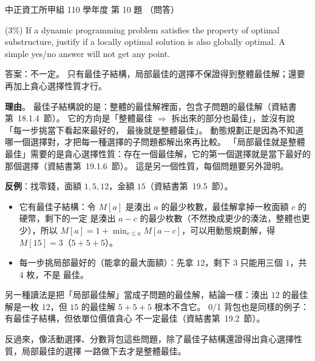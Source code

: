 \begin{pastexam}[label={px:ccu-110-swa-08}]{中正資工所甲組 110 學年度 第 10 題}
（問答）

(3\%) If a dynamic programming problem satisfies the property of optimal substructure, justify if
a locally optimal solution is also globally optimal. A simple yes/no answer will not get any
point.
\end{pastexam}

\begin{pastsoln}
答案：不一定。 只有最佳子結構，局部最佳的選擇不保證得到整體最佳解；還要再加上貪心選擇性質才行。

\textbf{理由}。 最佳子結構說的是：整體的最佳解裡面，包含子問題的最佳解（資結書第~18.1.4~節）。
它的方向是「整體最佳 $\Rightarrow$ 拆出來的部分也最佳」，並沒有說「每一步挑當下看起來最好的，
最後就是整體最佳」。 動態規劃正是因為不知道哪一個選擇對，才把每一種選擇的子問題都解出來再比較。
「局部最佳就是整體最佳」需要的是貪心選擇性質：存在一個最佳解，它的第一個選擇就是當下最好的
那個選擇（資結書第~19.1.6~節）。 這是另一個性質，每個問題要另外證明。

\textbf{反例}：找零錢，面額 $1, 5, 12$，金額 $15$（資結書第~19.5~節）。
\begin{itemize}
\item 它有最佳子結構：令 $M[a]$ 是湊出 $a$ 的最少枚數，最佳解拿掉一枚面額 $c$ 的硬幣，剩下的一定
是湊出 $a - c$ 的最少枚數（不然換成更少的湊法，整體也更少），所以
$M[a] = 1 + \min_{c \le a} M[a - c]$，可以用動態規劃解，得 $M[15] = 3$（$5 + 5 + 5$）。
\item 每一步挑局部最好的（能拿的最大面額）：先拿 $12$，剩下 $3$ 只能用三個 $1$，共 $4$ 枚，不是
最佳。
\end{itemize}
另一種讀法是把「局部最佳解」當成子問題的最佳解，結論一樣：湊出 $12$ 的最佳解是一枚 $12$，但
$15$ 的最佳解 $5 + 5 + 5$ 根本不含它。 0/1 背包也是同樣的例子：有最佳子結構，但依單位價值貪心
不一定最佳（資結書第~19.2~節）。

反過來，像活動選擇、分數背包這些問題，除了最佳子結構還證得出貪心選擇性質，局部最佳的選擇
一路做下去才是整體最佳。
\end{pastsoln}
